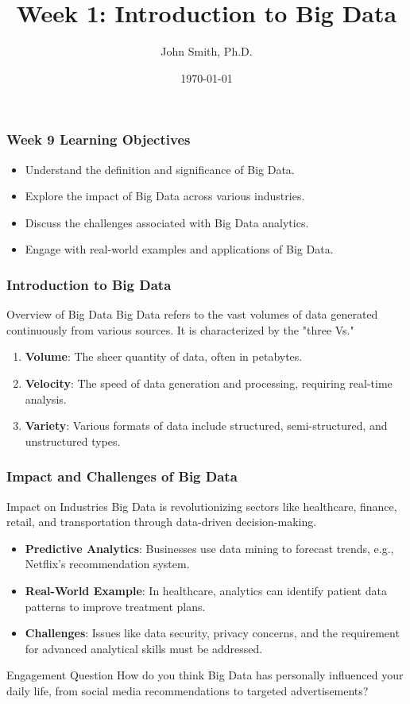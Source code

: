 \documentclass[aspectratio=169]{beamer}
\title[Week 1: Introduction to Big Data]{Week 1: Introduction to Big Data}
\author[J. Smith]{John Smith, Ph.D.}
\institute[University Name]{
  Department of Computer Science\\
  University Name\\
  \vspace{0.3cm}
  Email: email@university.edu\\
  Website: www.university.edu
}
\date{\today}
\begin{document}
\frame{\titlepage}

\begin{frame}[fragile]
    \frametitle{Week 9 Learning Objectives}
    \begin{itemize}
        \item Understand the definition and significance of Big Data.
        \item Explore the impact of Big Data across various industries.
        \item Discuss the challenges associated with Big Data analytics.
        \item Engage with real-world examples and applications of Big Data.
    \end{itemize}
\end{frame}

\begin{frame}[fragile]
    \frametitle{Introduction to Big Data}
    \begin{block}{Overview of Big Data}
        Big Data refers to the vast volumes of data generated continuously from various sources. It is characterized by the "three Vs."
    \end{block}
    \begin{enumerate}
        \item \textbf{Volume}: The sheer quantity of data, often in petabytes.
        \item \textbf{Velocity}: The speed of data generation and processing, requiring real-time analysis.
        \item \textbf{Variety}: Various formats of data include structured, semi-structured, and unstructured types.
    \end{enumerate}
\end{frame}

\begin{frame}[fragile]
    \frametitle{Impact and Challenges of Big Data}
    \begin{block}{Impact on Industries}
        Big Data is revolutionizing sectors like healthcare, finance, retail, and transportation through data-driven decision-making.
    \end{block}
    \begin{itemize}
        \item \textbf{Predictive Analytics}: Businesses use data mining to forecast trends, e.g., Netflix’s recommendation system.
        \item \textbf{Real-World Example}: In healthcare, analytics can identify patient data patterns to improve treatment plans.
        \item \textbf{Challenges}: Issues like data security, privacy concerns, and the requirement for advanced analytical skills must be addressed.
    \end{itemize}
    \begin{block}{Engagement Question}
        How do you think Big Data has personally influenced your daily life, from social media recommendations to targeted advertisements?
    \end{block}
\end{frame}
\end{document}
